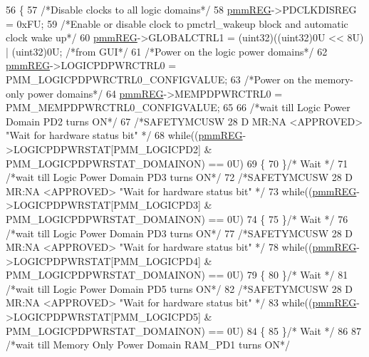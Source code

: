 \begin{DoxyCode}
56 \{
57     \textcolor{comment}{/*Disable clocks to all logic domains*/}
58     \mbox{\hyperlink{reg__pmm_8h_a57b193bea1bf1951b97bdfee07f48598}{pmmREG}}->PDCLKDISREG = 0xFU;
59     \textcolor{comment}{/*Enable or disable clock to pmctrl\_wakeup block and automatic clock wake up*/}
60     \mbox{\hyperlink{reg__pmm_8h_a57b193bea1bf1951b97bdfee07f48598}{pmmREG}}->GLOBALCTRL1 = (uint32)((uint32)0U << 8U) | (uint32)0U; \textcolor{comment}{/*from GUI*/}
61     \textcolor{comment}{/*Power on the logic power domains*/}
62     \mbox{\hyperlink{reg__pmm_8h_a57b193bea1bf1951b97bdfee07f48598}{pmmREG}}->LOGICPDPWRCTRL0 = PMM\_LOGICPDPWRCTRL0\_CONFIGVALUE;
63     \textcolor{comment}{/*Power on the memory-only power domains*/}
64     \mbox{\hyperlink{reg__pmm_8h_a57b193bea1bf1951b97bdfee07f48598}{pmmREG}}->MEMPDPWRCTRL0 = PMM\_MEMPDPWRCTRL0\_CONFIGVALUE;
65 
66     \textcolor{comment}{/*wait till Logic Power Domain PD2 turns ON*/}
67     \textcolor{comment}{/*SAFETYMCUSW 28 D MR:NA <APPROVED> "Wait for hardware status bit" */}
68     \textcolor{keywordflow}{while}((\mbox{\hyperlink{reg__pmm_8h_a57b193bea1bf1951b97bdfee07f48598}{pmmREG}}->LOGICPDPWRSTAT[PMM\_LOGICPD2] & PMM\_LOGICPDPWRSTAT\_DOMAINON) == 0U)
69     \{ 
70     \}\textcolor{comment}{/* Wait */}  
71     \textcolor{comment}{/*wait till Logic Power Domain PD3 turns ON*/}
72     \textcolor{comment}{/*SAFETYMCUSW 28 D MR:NA <APPROVED> "Wait for hardware status bit" */}
73     \textcolor{keywordflow}{while}((\mbox{\hyperlink{reg__pmm_8h_a57b193bea1bf1951b97bdfee07f48598}{pmmREG}}->LOGICPDPWRSTAT[PMM\_LOGICPD3] & PMM\_LOGICPDPWRSTAT\_DOMAINON) == 0U)
74     \{ 
75     \}\textcolor{comment}{/* Wait */}  
76     \textcolor{comment}{/*wait till Logic Power Domain PD3 turns ON*/}
77     \textcolor{comment}{/*SAFETYMCUSW 28 D MR:NA <APPROVED> "Wait for hardware status bit" */}
78     \textcolor{keywordflow}{while}((\mbox{\hyperlink{reg__pmm_8h_a57b193bea1bf1951b97bdfee07f48598}{pmmREG}}->LOGICPDPWRSTAT[PMM\_LOGICPD4] & PMM\_LOGICPDPWRSTAT\_DOMAINON) == 0U)
79     \{ 
80     \}\textcolor{comment}{/* Wait */}  
81     \textcolor{comment}{/*wait till Logic Power Domain PD5 turns ON*/}
82     \textcolor{comment}{/*SAFETYMCUSW 28 D MR:NA <APPROVED> "Wait for hardware status bit" */}
83     \textcolor{keywordflow}{while}((\mbox{\hyperlink{reg__pmm_8h_a57b193bea1bf1951b97bdfee07f48598}{pmmREG}}->LOGICPDPWRSTAT[PMM\_LOGICPD5] & PMM\_LOGICPDPWRSTAT\_DOMAINON) == 0U)
84     \{ 
85     \}\textcolor{comment}{/* Wait */}  
86 
87     \textcolor{comment}{/*wait till Memory Only Power Domain RAM\_PD1 turns ON*/}

\end{DoxyCode}
